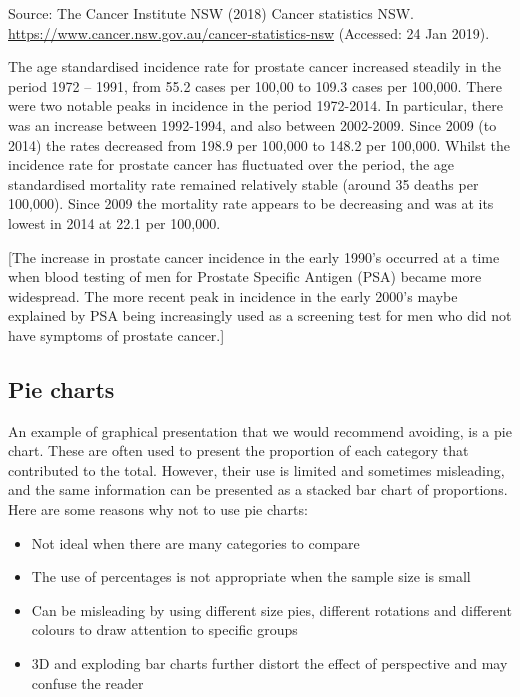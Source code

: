\documentclass[
]{memoir}
\providecommand{\tightlist}{%
  \setlength{\itemsep}{0pt}\setlength{\parskip}{0pt}}
\begin{document}
Source: The Cancer Institute NSW (2018) Cancer statistics NSW. \url{https://www.cancer.nsw.gov.au/cancer-statistics-nsw} (Accessed: 24 Jan 2019).

The age standardised incidence rate for prostate cancer increased steadily in the period 1972 -- 1991, from 55.2 cases per 100,00 to 109.3 cases per 100,000. There were two notable peaks in incidence in the period 1972-2014. In particular, there was an increase between 1992-1994, and also between 2002-2009. Since 2009 (to 2014) the rates decreased from 198.9 per 100,000 to 148.2 per 100,000. Whilst the incidence rate for prostate cancer has fluctuated over the period, the age standardised mortality rate remained relatively stable (around 35 deaths per 100,000). Since 2009 the mortality rate appears to be decreasing and was at its lowest in 2014 at 22.1 per 100,000.

{[}The increase in prostate cancer incidence in the early 1990's occurred at a time when blood testing of men for Prostate Specific Antigen (PSA) became more widespread. The more recent peak in incidence in the early 2000's maybe explained by PSA being increasingly used as a screening test for men who did not have symptoms of prostate cancer.{]}

\hypertarget{pie-charts}{%
\subsection{Pie charts}\label{pie-charts}}

An example of graphical presentation that we would recommend avoiding, is a pie chart. These are often used to present the proportion of each category that contributed to the total. However, their use is limited and sometimes misleading, and the same information can be presented as a stacked bar chart of proportions. Here are some reasons why not to use pie charts:

\begin{itemize}
\tightlist
\item
  Not ideal when there are many categories to compare
\item
  The use of percentages is not appropriate when the sample size is small
\item
  Can be misleading by using different size pies, different rotations and different colours to draw attention to specific groups
\item
  3D and exploding bar charts further distort the effect of perspective and may confuse the reader
\end{itemize}
\end{document}
